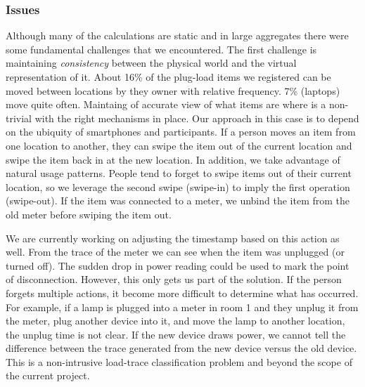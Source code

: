 \subsubsection{Issues}
Although many of the calculations are static and in large aggregates there were some fundamental challenges that
we encountered.  The first challenge is maintaining \emph{consistency} between the physical world and the virtual
representation of it.  About 16\% of the plug-load items we registered can be moved between locations by they owner
with relative frequency.  7\% (laptops) move quite often.  Maintaing of accurate view of what items are where
is a non-trivial with the right mechanisms in place.  Our approach in this case is to depend on the ubiquity of
smartphones and participants.  If a person moves an item from one location to another, they can swipe the item out
of the current location and swipe the item back in at the new location.  In addition, we take advantage of
natural usage patterns.  People tend to forget to swipe items out of their current location, so we leverage the
second swipe (swipe-in) to imply the first operation (swipe-out).  If the item was connected to a meter, we unbind the item
from the old meter before swiping the item out.  

We are currently working on adjusting the timestamp based on this action as well.
From the trace of the meter we can see when the item was unplugged (or turned off).  The sudden drop in power
reading could be used to mark the point of disconnection.  However, this only gets us part of the solution.  If the person
forgets multiple actions, it become more difficult to determine what has occurred.  For example, if a lamp is plugged
into a meter in room 1 and they unplug it from the meter, plug another device into it, and move the lamp to
another location, the unplug time is not clear.  If the new device draws power, we cannot tell the difference between
the trace generated from the new device versus the old device.  This is a non-intrusive load-trace classification
problem and beyond the scope of the current project.

